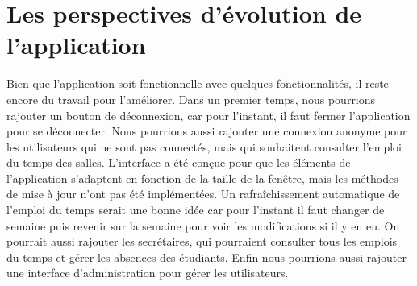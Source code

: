\documentclass[a4paper,12pt]{article}
\begin{document}
\section{Les perspectives d’évolution de l’application}
Bien que l'application soit fonctionnelle avec quelques fonctionnalités, il reste encore du travail pour l'améliorer.
Dans un premier temps, nous pourrions rajouter un bouton de déconnexion, car pour l'instant, il faut fermer l'application pour se déconnecter.
Nous pourrions aussi rajouter une connexion anonyme pour les utilisateurs qui ne sont pas connectés, mais qui souhaitent consulter l'emploi du temps des salles.
L'interface a été conçue pour que les éléments de l'application s'adaptent en fonction de la taille de la fenêtre, mais les méthodes de mise à jour n'ont pas été implémentées.
Un rafraîchissement automatique de l'emploi du temps serait une bonne idée car pour l'instant il faut changer de semaine puis revenir sur la semaine pour voir les modifications si il y en eu.
On pourrait aussi rajouter les secrétaires, qui pourraient consulter tous les emplois du temps et gérer les absences des étudiants.
Enfin nous pourrions aussi rajouter une interface d'administration pour gérer les utilisateurs.
\end{document}
